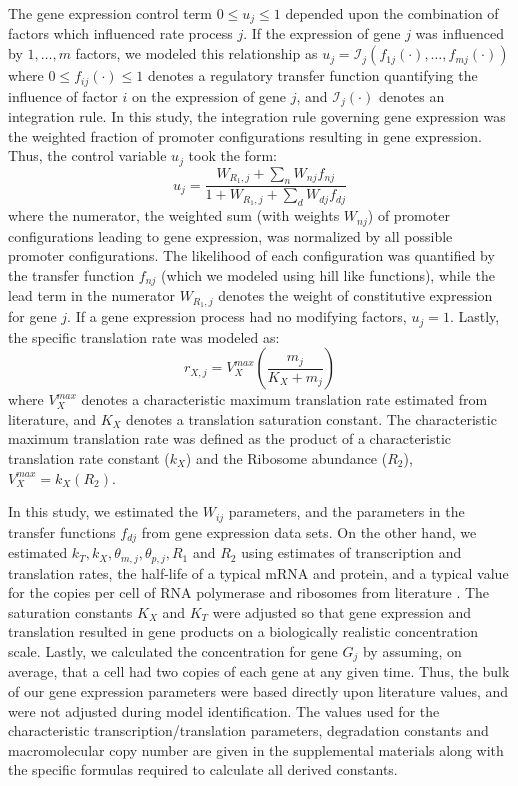 \documentclass[12pt]{article}
\begin{document}
The gene expression control term $0\leq u_{j}\leq 1$ depended upon the combination of factors which influenced rate process $j$.
If the expression of gene $j$ was influenced by $1,\dots,m$ factors, we modeled this relationship as
$u_{j}=\mathcal{I}_{j}\left(f_{1j}\left(\cdot\right),\hdots,f_{mj}\left(\cdot\right)\right)$
where $0\leq f_{ij}\left(\cdot\right)\leq 1$ denotes a regulatory transfer function quantifying the influence of factor $i$ on the expression of gene $j$,
and $\mathcal{I}_{j}\left(\cdot\right)$ denotes an integration rule.
In this study, the integration rule governing gene expression was the weighted fraction of promoter configurations resulting in gene expression.
Thus, the control variable $u_{j}$ took the form:
\begin{equation}
	{u}_{j} = \frac{W_{R_{1},j}+\displaystyle\sum_{n}W_{nj}f_{nj}}{1+W_{R_{1},j}+\displaystyle\sum_{d}W_{dj}f_{dj}}
\end{equation}where the numerator, the weighted sum (with weights $W_{nj}$) of promoter configurations leading to gene expression, was normalized by all possible promoter configurations.
The likelihood of each configuration was quantified by the transfer function $f_{nj}$ (which we modeled using hill like functions), while
the lead term in the numerator $W_{R_{1},j}$ denotes the weight of constitutive expression for gene $j$.
If a gene expression process had no modifying factors, $u_{j}=1$.
Lastly, the specific translation rate was modeled as:
\begin{equation}
	r_{X,j} = V^{max}_{X}\left(\frac{m_{j}}{K_{X}+m_{j}}\right)
\end{equation}
where $V^{max}_{X}$ denotes a characteristic maximum translation rate estimated from literature, and $K_{X}$ denotes a translation saturation constant.
The characteristic maximum translation rate was defined as the product of a characteristic translation rate constant ($k_{X}$)
and the Ribosome abundance ($R_{2}$), $V^{max}_{X} = k_{X}\left(R_{2}\right)$.

In this study, we estimated the $W_{ij}$ parameters, and the parameters in the transfer functions $f_{dj}$ from gene expression data sets.
On the other hand, we estimated $k_{T}, k_{X}, \theta_{m,j}, \theta_{p,j}, R_{1}$ and $R_{2}$ using estimates of transcription and translation rates,
the half-life of a typical mRNA and protein, and a typical value for the copies per cell of RNA polymerase and ribosomes from literature \cite{Milo:2010aa}.
The saturation constants $K_{X}$ and $K_{T}$ were adjusted so that gene expression and translation resulted in gene products on a biologically realistic concentration scale.
Lastly, we calculated the concentration for gene $G_{j}$ by assuming, on average, that a cell had two copies of each gene at any given time.
Thus, the bulk of our gene expression parameters were based directly upon literature values, and were not adjusted during model identification.
The values used for the characteristic transcription/translation parameters, degradation constants and
macromolecular copy number are given in the supplemental materials along with the specific formulas required to calculate all derived constants.
\end{document}
